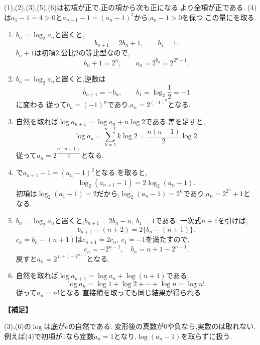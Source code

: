   (1),(2),(3),(5),(6)は初項が正で,正の項から次も正になる.より全項が正である.
  (4)は$a_1-1=4>0$と$a_{n+1}-1=(a_n-1)^2$から,$a_n-1>0$を保つ.この量にを取る.
  \begin{enumerate}[label=(\arabic*),parsep=3pt,format=\bookitemlink{example-logarithmic-1}{solution}{problem}]
    \item $b_n=\log_2a_n$と置くと,
      \[
        b_{n+1}=2b_n+1,\qquad b_1=1.
      \]
      $b_n+1$は初項$2$,公比$2$の等比型なので,
      \[
        b_n+1=2^n,\qquad a_n=2^{b_n}=2^{2^n-1}.
      \]
    \item $b_n=\log_2a_n$と置くと,逆数は
      \[
        b_{n+1}=-b_n,\qquad b_1=\log_2\frac12=-1
      \]
      に変わる.従って$b_n=(-1)^n$であり,$a_n=2^{(-1)^n}$となる.
    \item 自然を取れば$\log a_{n+1}=\log a_n+n\log2$である.差を足すと,
      \[
        \log a_n=\sum_{k=1}^{n-1}k\log2=\frac{n(n-1)}2\log2.
      \]
      従って$a_n=2^{\dfrac{n(n-1)}{2}}$となる.
    \item {}で$a_{n+1}-1=(a_n-1)^2$となる.を取ると,
      \[
        \log_2(a_{n+1}-1)=2\log_2(a_n-1).
      \]
      初項は$\log_2(a_1-1)=2$だから,$\log_2(a_n-1)=2^n$であり,$a_n=2^{2^n}+1$となる.
    \item $b_n=\log_2a_n$と置くと,$b_{n+1}=2b_n-n,\ b_1=1$である.
      一次式$n+1$を引けば,
      \[
        b_{n+1}-(n+2)=2\{b_n-(n+1)\}.
      \]
      $c_n=b_n-(n+1)$は$c_{n+1}=2c_n,\ c_1=-1$を満たすので,
      \[
        c_n=-2^{n-1},\quad b_n=n+1-2^{n-1}.
      \]
      戻すと$a_n=2^{\,n+1-2^{n-1}}$となる.
    \item 自然を取れば$\log a_{n+1}=\log a_n+\log(n+1)$である.
      \[
        \log a_n=\log1+\log2+\cdots+\log n=\log n!.
      \]
      従って$a_n=n!$となる.直接積を取っても同じ結果が得られる.
  \end{enumerate}
  \noindent\textbf{【補足】}
  
  (3),(6)の$\log$は底が$e$の自然である.
  変形後の真数が$0$や負なら,実数のは取れない.例えば(4)で初項が$1$なら定数$a_n=1$となり,$\log(a_n-1)$を取らずに扱う.
  
